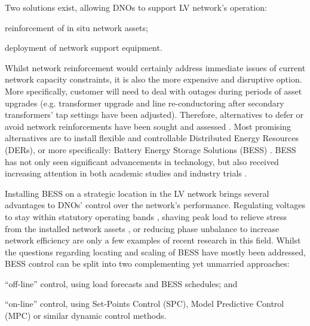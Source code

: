 Two solutions exist, allowing DNOs to support LV network's operation: 
\begin{enumerate*}
	\item reinforcement of in situ network assets;
	\item deployment of network support equipment.
\end{enumerate*}
Whilst network reinforcement would certainly address immediate issues of current network capacity constraints, it is also the more expensive and disruptive option.
More specifically, customer will need to deal with outages during periods of asset upgrades (e.g. transformer upgrade and line re-conductoring after secondary transformers' tap settings have been adjusted).
Therefore, alternatives to defer or avoid network reinforcements have been sought and assessed \cite{Harrison2007, Zangs2016a, VanderKlauw2016d, Greenwood2017}.
Most promising alternatives are to install flexible and controllable Distributed Energy Resources (DERs), or more specifically: Battery Energy Storage Solutions (BESS) \cite{Wade2010}.
BESS has not only seen significant advancements in technology, but also received increasing attention in both academic studies and industry trials \cite{Palizban2016}.

Installing BESS on a strategic location in the LV network brings several advantages to DNOs' control over the network's performance.
Regulating voltages to stay within statutory operating bands \cite{Yang2014}, shaving peak load to relieve stress from the installed network assets \cite{Bennett2015}, or reducing phase unbalance to increase network efficiency \cite{Wang2015b} are only a few examples of recent research in this field.
Whilst the questions regarding locating and scaling of BESS have mostly been addressed, BESS control can be split into two complementing yet unmarried approaches:
\begin{enumerate*}
	\item ``off-line'' control, using load forecasts and BESS schedules; and
	\item ``on-line'' control, using Set-Points Control (SPC), Model Predictive Control (MPC) or similar dynamic control methods.
\end{enumerate*}

